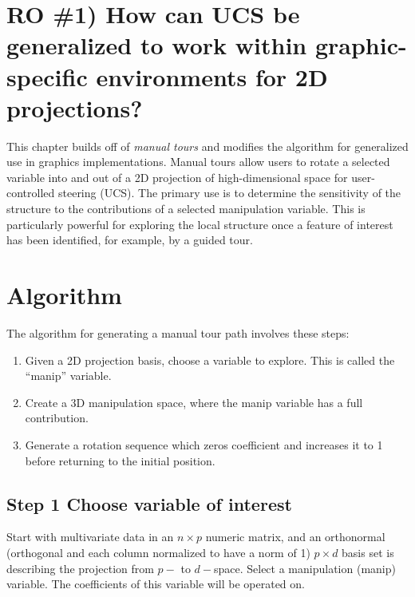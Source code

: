 \documentclass{monashthesis}
\begin{document}
\section{RO \#1) How can UCS be generalized to work within
graphic-specific environments for 2D
projections?}\label{ro-1-how-can-ucs-be-generalized-to-work-within-graphic-specific-environments-for-2d-projections}

This chapter builds off of \emph{manual tours}
\autocite{cook_manual_1997} and modifies the algorithm for generalized
use in graphics implementations. Manual tours allow users to rotate a
selected variable into and out of a 2D projection of high-dimensional
space for user-controlled steering (UCS). The primary use is to
determine the sensitivity of the structure to the contributions of a
selected manipulation variable. This is particularly powerful for
exploring the local structure once a feature of interest has been
identified, for example, by a guided tour.

\section{Algorithm}\label{sec:algorithm}

The algorithm for generating a manual tour path involves these steps:

\begin{enumerate}
\def\labelenumi{\arabic{enumi}.}
\tightlist
\item
  Given a 2D projection basis, choose a variable to explore. This is
  called the ``manip'' variable.
\item
  Create a 3D manipulation space, where the manip variable has a full
  contribution.
\item
  Generate a rotation sequence which zeros coefficient and increases it
  to 1 before returning to the initial position.
\end{enumerate}

\subsection{Step 1 Choose variable of
interest}\label{step-1-choose-variable-of-interest}

Start with multivariate data in an \(n \times p\) numeric matrix, and an
orthonormal (orthogonal and each column normalized to have a norm of 1)
\(p \times d\) basis set is describing the projection from \(p-\) to
\(d-\)space. Select a manipulation (manip) variable. The coefficients of
this variable will be operated on.
\end{document}
